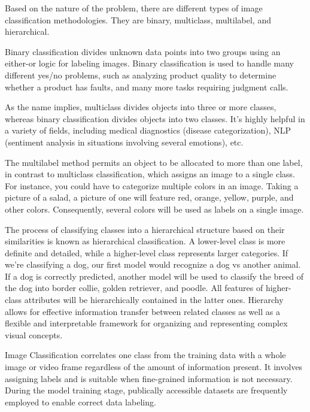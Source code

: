 Based on the nature of the problem, there are different types of image classification methodologies. They are binary, multiclass, multilabel, and hierarchical.

Binary classification divides unknown data points into two groups using an either-or logic for labeling images. Binary classification is used to handle many different yes/no problems, such as analyzing product quality to determine whether a product has faults, and many more tasks requiring judgment calls.

As the name implies, multiclass divides objects into three or more classes, whereas binary classification divides objects into two classes. It's highly helpful in a variety of fields, including medical diagnostics (disease categorization), NLP (sentiment analysis in situations involving several emotions), etc.

The multilabel method permits an object to be allocated to more than one label, in contrast to multiclass classification, which assigns an image to a single class. For instance, you could have to categorize multiple colors in an image. Taking a picture of a salad, a picture of one will feature red, orange, yellow, purple, and other colors. Consequently, several colors will be used as labels on a single image.

The process of classifying classes into a hierarchical structure based on their similarities is known as hierarchical classification. A lower-level class is more definite and detailed, while a higher-level class represents larger categories. If we're classifying a dog, our first model would recognize a dog vs another animal. If a dog is correctly predicted, another model will be used to classify the breed of the dog into border collie, golden retriever, and poodle. All features of higher-class attributes will be hierarchically contained in the latter ones. Hierarchy allows for effective information transfer between related classes as well as a flexible and interpretable framework for organizing and representing complex visual concepts.


Image Classification correlates one class from the training data with a whole image or video frame regardless of the amount of information present. It involves assigning labels and is suitable when fine-grained information is not necessary. During the model training stage, publically accessible datasets are frequently employed to enable correct data labeling.

